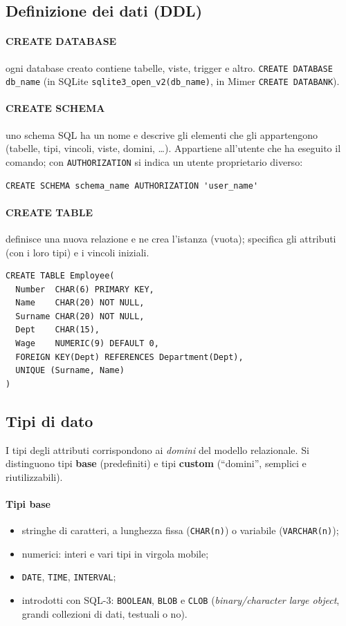 \documentclass[a4paper,12pt]{article}
\begin{document}
\subsection{Definizione dei dati (DDL)}

\paragraph{CREATE DATABASE} ogni database creato contiene tabelle, viste,
trigger e altro. \texttt{CREATE DATABASE db\_name} (in SQLite
\texttt{sqlite3\_open\_v2(db\_name)}, in Mimer \texttt{CREATE DATABANK}).

\paragraph{CREATE SCHEMA} uno schema SQL ha un nome e descrive gli elementi che
gli appartengono (tabelle, tipi, vincoli, viste, domini, \dots). Appartiene
all'utente che ha eseguito il comando; con \texttt{AUTHORIZATION} si indica un
utente proprietario diverso:
\begin{verbatim}
CREATE SCHEMA schema_name AUTHORIZATION 'user_name'
\end{verbatim}

\paragraph{CREATE TABLE} definisce una nuova relazione e ne crea l'istanza
(vuota); specifica gli attributi (con i loro tipi) e i vincoli iniziali.
\begin{verbatim}
CREATE TABLE Employee(
  Number  CHAR(6) PRIMARY KEY,
  Name    CHAR(20) NOT NULL,
  Surname CHAR(20) NOT NULL,
  Dept    CHAR(15),
  Wage    NUMERIC(9) DEFAULT 0,
  FOREIGN KEY(Dept) REFERENCES Department(Dept),
  UNIQUE (Surname, Name)
)
\end{verbatim}

\subsection{Tipi di dato}

I tipi degli attributi corrispondono ai \emph{domini} del modello relazionale.
Si distinguono tipi \textbf{base} (predefiniti) e tipi \textbf{custom}
(``domini'', semplici e riutilizzabili).

\paragraph{Tipi base}
\begin{itemize}
  \item stringhe di caratteri, a lunghezza fissa (\texttt{CHAR(n)}) o variabile
    (\texttt{VARCHAR(n)});
  \item numerici: interi e vari tipi in virgola mobile;
  \item \texttt{DATE}, \texttt{TIME}, \texttt{INTERVAL};
  \item introdotti con SQL-3: \texttt{BOOLEAN}, \texttt{BLOB} e \texttt{CLOB}
    (\emph{binary/character large object}, grandi collezioni di dati,
    testuali o no).
\end{itemize}
\end{document}
